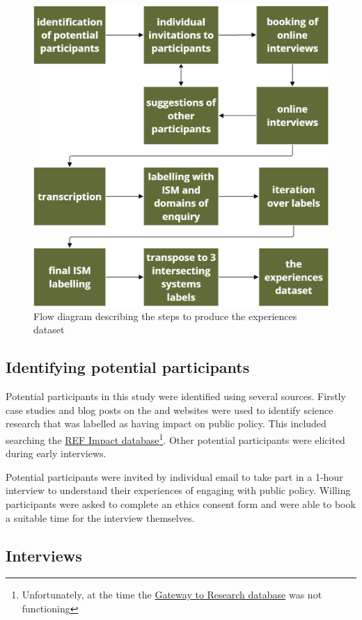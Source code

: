 \begin{figure}[!ht]
    \centering
    \includegraphics[width=.75\linewidth]{figures/method_flow.png}
    \caption{Flow diagram describing the steps to produce the experiences dataset}
    \label{fig:metflowchart}
\end{figure}

\subsection{Identifying potential participants}\label{sec:metidentify}

Potential participants in this study were identified using several sources. Firstly case studies and blog posts on the \REF{} and \UKRI{} websites were used to identify \CAN{} science research that was labelled as having impact on public policy. This included searching the \href{https://results2021.ref.ac.uk/impact}{REF Impact database}\footnote{Unfortunately, at the time the \UKRI{} \href{https://gtr.gtr.ukri.org/}{Gateway to Research database} was not functioning}. Other potential participants were elicited during early interviews.

Potential participants were invited by individual email to take part in a 1-hour interview to understand their experiences of engaging with public policy. Willing participants were asked to complete an ethics consent form and were able to book a suitable time for the interview themselves.

\subsection{Interviews}\label{sec:metinterview}

